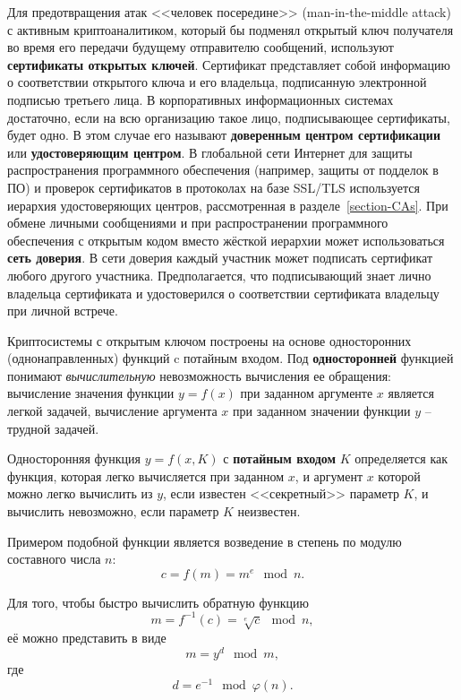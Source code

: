 Для предотвращения атак <<человек посередине>> (man-in-the-middle attack) с активным криптоаналитиком, который бы подменял открытый ключ получателя во время его передачи будущему отправителю сообщений, используют \textbf{сертификаты открытых ключей}. Сертификат представляет собой информацию о соответствии открытого ключа и его владельца, подписанную электронной подписью третьего лица. В корпоративных информационных системах достаточно, если на всю организацию такое лицо, подписывающее сертификаты, будет одно. В этом случае его называют \textbf{доверенным центром сертификации} или \textbf{удостоверяющим центром}. В глобальной сети Интернет для защиты распространения программного обеспечения (например, защиты от подделок в ПО) и проверок сертификатов в протоколах на базе SSL/TLS используется иерархия удостоверяющих центров, рассмотренная в разделе~\ref{section-CAs}. При обмене личными сообщениями и при распространении программного обеспечения с открытым кодом вместо жёсткой иерархии может использоваться \textbf{сеть доверия}. В сети доверия каждый участник может подписать сертификат любого другого участника. Предполагается, что подписывающий знает лично владельца сертификата и удостоверился о соответствии сертификата владельцу при личной встрече.

Криптосистемы с открытым ключом построены на основе односторонних (однонаправленных) функций c потайным входом. Под \textbf{односторонней} функцией понимают \emph{вычислительную} невозможность вычисления ее обращения: вычисление значения функции $y = f(x)$ при заданном аргументе $x$ является легкой задачей, вычисление аргумента $x$ при заданном значении функции $y$ -- трудной задачей.

Односторонняя функция $y = f(x,K)$ с \textbf{потайным входом} $K$ определяется как функция, которая легко вычисляется при заданном $x$, и аргумент $x$ которой можно легко вычислить из $y$, если известен <<секретный>> параметр $K$, и вычислить невозможно, если параметр $K$ неизвестен.

Примером подобной функции является возведение в степень по модулю составного числа $n$:
	\[ c = f \left( m \right) = m ^ e \mod n.\]

Для того, чтобы быстро вычислить обратную функцию
	\[ m = f^{-1} \left( c \right) = \sqrt[e]{c} \mod n, \]
её можно представить в виде
	\[ m = y^{d} \mod m,\]
где
	\[ d = e^{-1} \mod \varphi \left( n \right). \]

